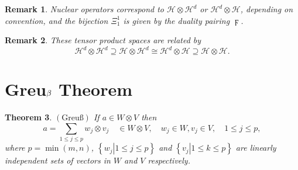 \documentclass[aps,preprint]{revtex4}
\newtheorem{theorem}{Theorem}
\newtheorem{remark}[theorem]{Remark}
\begin{document}
\begin{remark}
Nuclear operators correspond to $\mathcal{H}\otimes \mathcal{H}^{d}$ or $%
\mathcal{H}^{d}\otimes \mathcal{H}$, depending on convention, and the
bijection $\Xi _{1}^{1}$ is given by the duality pairing $\digamma $.
\end{remark}

\begin{remark}
These tensor product spaces are related by 
\begin{equation}
\mathcal{H}^{d}\otimes \mathcal{H}^{d}\supseteq \mathcal{H}\otimes \mathcal{H%
}^{d}\cong \mathcal{H}^{d}\otimes \mathcal{H\supseteq H}\otimes \mathcal{H}.
\end{equation}
\end{remark}

\section{Greu$\protect\beta $ Theorem}

\begin{theorem}
\label{GreuB Theorem} $\left( \text{Greu\ss }\right) $ If $a\in W\otimes V$
then 
\begin{equation}
a=\sum_{1\leq j\leq p}w_{j}\otimes v_{j}\quad \in W\otimes V,\quad w_{j}\in
W,v_{j}\in V,\mathcal{\quad }1\leq j\leq p,
\end{equation}%
where $p=\min \left( m,n\right) $, $\left\{ \left. w_{j}\right\vert 1\leq
j\leq p\right\} $ and $\left\{ \left. v_{j}\right\vert 1\leq k\leq p\right\} 
$ are linearly independent sets of vectors in $W$ and $V$ respectively.
\end{theorem}
\end{document}
